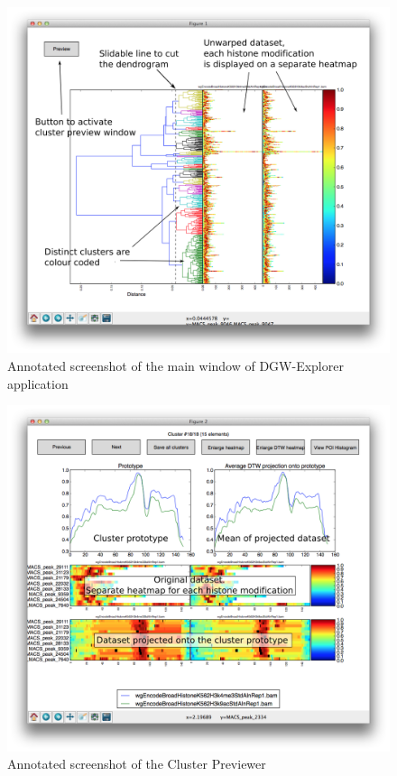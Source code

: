 \documentclass[parskip]{cs4rep}
\begin{document}
\begin{figure}[p]
   \centering
       \includegraphics[height=0.45\textheight]{figures/implementation/explorer/main-window.png}
       
   \caption{Annotated screenshot of the main window of DGW-Explorer application}
   \label{fig:implementation:explorer:main}
\end{figure}

\begin{figure}[p]
    \centering
    \includegraphics[height=0.45\textheight]{figures/implementation/explorer/previewer-window.png}
    \caption{Annotated screenshot of the Cluster Previewer}
    \label{fig:implementation:explorer:previewer}
\end{figure}
\end{document}
